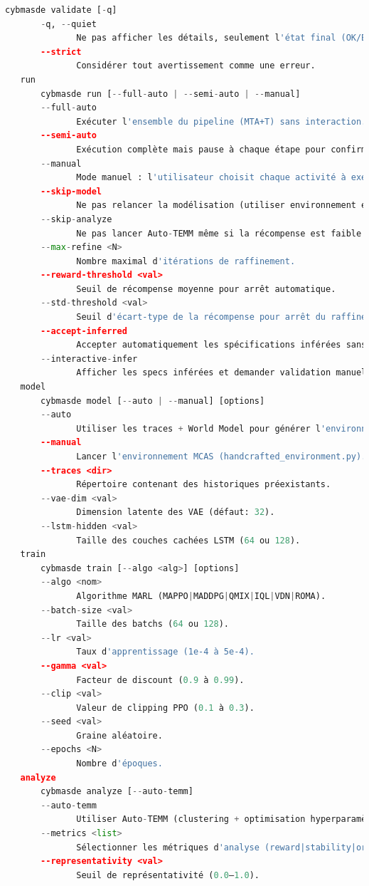 \begin{lstlisting}[language=Python,basicstyle=\scriptsize, label={lst:cybmasde_environment_api}, caption={Excerpt from the template file to be used to implement the environmental API.}]
       cybmasde validate [-q]
       -q, --quiet
              Ne pas afficher les détails, seulement l'état final (OK/ERREUR).
       --strict
              Considérer tout avertissement comme une erreur.
   run
       cybmasde run [--full-auto | --semi-auto | --manual]
       --full-auto
              Exécuter l'ensemble du pipeline (MTA+T) sans interaction.
       --semi-auto
              Exécution complète mais pause à chaque étape pour confirmation.
       --manual
              Mode manuel : l'utilisateur choisit chaque activité à exécuter.
       --skip-model
              Ne pas relancer la modélisation (utiliser environnement existant).
       --skip-analyze
              Ne pas lancer Auto-TEMM même si la récompense est faible.
       --max-refine <N>
              Nombre maximal d'itérations de raffinement.
       --reward-threshold <val>
              Seuil de récompense moyenne pour arrêt automatique.
       --std-threshold <val>
              Seuil d'écart-type de la récompense pour arrêt du raffinement.
       --accept-inferred
              Accepter automatiquement les spécifications inférées sans validation humaine.
       --interactive-infer
              Afficher les specs inférées et demander validation manuelle (défaut).
   model
       cybmasde model [--auto | --manual] [options]
       --auto
              Utiliser les traces + World Model pour générer l'environnement.
       --manual
              Lancer l'environnement MCAS (handcrafted_environment.py).
       --traces <dir>
              Répertoire contenant des historiques préexistants.
       --vae-dim <val>
              Dimension latente des VAE (défaut: 32).
       --lstm-hidden <val>
              Taille des couches cachées LSTM (64 ou 128).
   train
       cybmasde train [--algo <alg>] [options]
       --algo <nom>
              Algorithme MARL (MAPPO|MADDPG|QMIX|IQL|VDN|ROMA).
       --batch-size <val>
              Taille des batchs (64 ou 128).
       --lr <val>
              Taux d'apprentissage (1e-4 à 5e-4).
       --gamma <val>
              Facteur de discount (0.9 à 0.99).
       --clip <val>
              Valeur de clipping PPO (0.1 à 0.3).
       --seed <val>
              Graine aléatoire.
       --epochs <N>
              Nombre d'époques.
   analyze
       cybmasde analyze [--auto-temm]
       --auto-temm
              Utiliser Auto-TEMM (clustering + optimisation hyperparamètres).
       --metrics <list>
              Sélectionner les métriques d'analyse (reward|stability|org_fit).
       --representativity <val>
              Seuil de représentativité (0.0–1.0).

\end{lstlisting}
